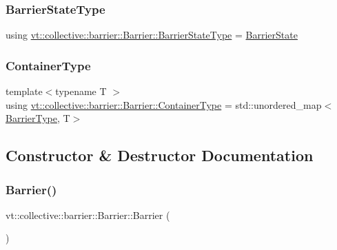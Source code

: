 \subsubsection{\texorpdfstring{Barrier\+State\+Type}{BarrierStateType}}
{\footnotesize\ttfamily using \hyperlink{structvt_1_1collective_1_1barrier_1_1_barrier_a9b612818f7b44ca65f2caee0dee094f3}{vt\+::collective\+::barrier\+::\+Barrier\+::\+Barrier\+State\+Type} =  \hyperlink{structvt_1_1collective_1_1barrier_1_1_barrier_state}{Barrier\+State}}

\mbox{\label{structvt_1_1collective_1_1barrier_1_1_barrier_a84bfbd26a48a1c3bb7272e81245e4873}} 
\subsubsection{\texorpdfstring{Container\+Type}{ContainerType}}
{\footnotesize\ttfamily template$<$typename T $>$ \\
using \hyperlink{structvt_1_1collective_1_1barrier_1_1_barrier_a84bfbd26a48a1c3bb7272e81245e4873}{vt\+::collective\+::barrier\+::\+Barrier\+::\+Container\+Type} =  std\+::unordered\+\_\+map$<$\hyperlink{namespacevt_a25e481f0d6bbc7204db23d1c87a62e77}{Barrier\+Type}, T$>$}



\subsection{Constructor \& Destructor Documentation}
\mbox{\label{structvt_1_1collective_1_1barrier_1_1_barrier_aa69e5135299fa366a2c59ac96a9f318d}} 
\subsubsection{\texorpdfstring{Barrier()}{Barrier()}}
{\footnotesize\ttfamily vt\+::collective\+::barrier\+::\+Barrier\+::\+Barrier (\begin{DoxyParamCaption}{ }\end{DoxyParamCaption})}



